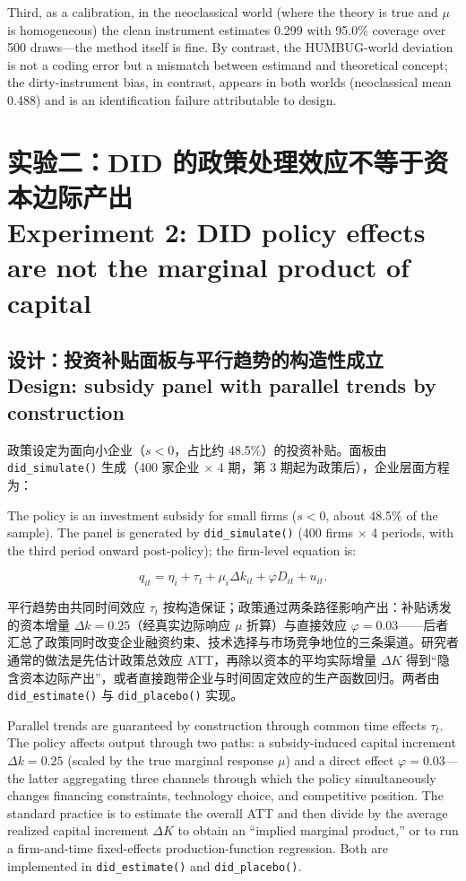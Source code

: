 \documentclass[12pt,a4paper]{ctexart}
\begin{document}
Third, as a calibration, in the neoclassical world (where the theory is true and $\mu$ is homogeneous) the clean instrument estimates 0.299 with 95.0\% coverage over 500 draws—the method itself is fine. By contrast, the HUMBUG-world deviation is not a coding error but a mismatch between estimand and theoretical concept; the dirty-instrument bias, in contrast, appears in both worlds (neoclassical mean 0.488) and is an identification failure attributable to design.

\section[实验二：DID]{实验二：DID 的政策处理效应不等于资本边际产出\\[2pt]\normalsize Experiment 2: DID policy effects are not the marginal product of capital}

\subsection[设计]{设计：投资补贴面板与平行趋势的构造性成立\\[1pt]\normalsize Design: subsidy panel with parallel trends by construction}

政策设定为面向小企业（$s < 0$，占比约 48.5\%）的投资补贴。面板由 \texttt{did\_simulate()} 生成（400 家企业 $\times$ 4 期，第 3 期起为政策后），企业层面方程为：

The policy is an investment subsidy for small firms ($s<0$, about 48.5\% of the sample). The panel is generated by \texttt{did\_simulate()} (400 firms $\times$ 4 periods, with the third period onward post-policy); the firm-level equation is:

\begin{equation}\label{eq:did}
q_{it} = \eta_i + \tau_t + \mu_i \Delta k_{it} + \varphi D_{it} + u_{it} .
\end{equation}

平行趋势由共同时间效应 $\tau_t$ 按构造保证；政策通过两条路径影响产出：补贴诱发的资本增量 $\Delta k = 0.25$（经真实边际响应 $\mu$ 折算）与直接效应 $\varphi = 0.03$——后者汇总了政策同时改变企业融资约束、技术选择与市场竞争地位的三条渠道。研究者通常的做法是先估计政策总效应 ATT，再除以资本的平均实际增量 $\Delta K$ 得到“隐含资本边际产出”，或者直接跑带企业与时间固定效应的生产函数回归。两者由 \texttt{did\_estimate()} 与 \texttt{did\_placebo()} 实现。

Parallel trends are guaranteed by construction through common time effects $\tau_t$. The policy affects output through two paths: a subsidy-induced capital increment $\Delta k=0.25$ (scaled by the true marginal response $\mu$) and a direct effect $\varphi=0.03$—the latter aggregating three channels through which the policy simultaneously changes financing constraints, technology choice, and competitive position. The standard practice is to estimate the overall ATT and then divide by the average realized capital increment $\Delta K$ to obtain an “implied marginal product,” or to run a firm-and-time fixed-effects production-function regression. Both are implemented in \texttt{did\_estimate()} and \texttt{did\_placebo()}.
\end{document}
